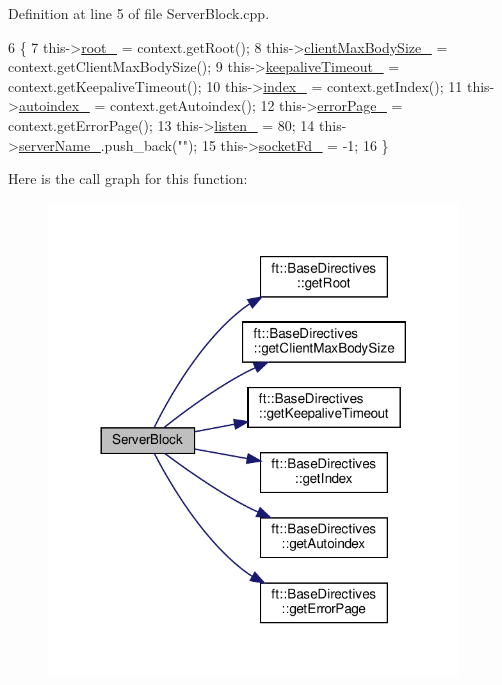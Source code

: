 Definition at line 5 of file Server\+Block.\+cpp.


\begin{DoxyCode}
6     \{
7         this->\hyperlink{classft_1_1_base_directives_abb1eaf0bba10b90172d6152e69457dc7}{root\_} = context.getRoot();
8         this->\hyperlink{classft_1_1_base_directives_ad65c2594d2a90ca065d410dfd4066a19}{clientMaxBodySize\_} = context.getClientMaxBodySize();
9         this->\hyperlink{classft_1_1_base_directives_aa1f5f394b428d0d18765a9b9e14e648f}{keepaliveTimeout\_} = context.getKeepaliveTimeout();
10         this->\hyperlink{classft_1_1_base_directives_a6ba30626837f300201cd32c35d50aa49}{index\_} = context.getIndex();
11         this->\hyperlink{classft_1_1_base_directives_a4ebffbe32f50a462afa139c6f03c1a4f}{autoindex\_} = context.getAutoindex();
12         this->\hyperlink{classft_1_1_base_directives_a5c0d388109f086503961de84fe3fce90}{errorPage\_} = context.getErrorPage();
13         this->\hyperlink{classft_1_1_server_block_aa3d35e32d01734ff75f940faaee932f5}{listen\_} = 80;
14         this->\hyperlink{classft_1_1_server_block_adc26ae834350b4c964d4198e7a431e90}{serverName\_}.push\_back(\textcolor{stringliteral}{""});
15         this->\hyperlink{classft_1_1_server_block_ab9901cea4f6daccf6b8f8a3c6f438e9c}{socketFd\_} = -1;
16     \}
\end{DoxyCode}
Here is the call graph for this function\+:
\nopagebreak
\begin{figure}[H]
\begin{center}
\leavevmode
\includegraphics[width=308pt]{classft_1_1_server_block_ac14b720cf43fb61943107d397f5427f4_cgraph}
\end{center}
\end{figure}


